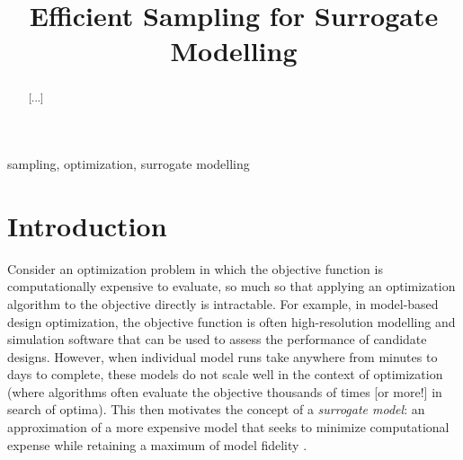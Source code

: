 \documentclass[conference]{IEEEtran}
\begin{document}

\title{Efficient Sampling for Surrogate Modelling}

\author{
}

\maketitle

\thispagestyle{plain}
\pagestyle{plain}



\begin{abstract}
[...]
\end{abstract}

\begin{IEEEkeywords}
sampling, optimization, surrogate modelling
\end{IEEEkeywords}



\section{Introduction}

	Consider an optimization problem in which the objective function is computationally expensive to evaluate, so much so that applying an optimization algorithm to the objective directly is intractable. For example, in model-based design optimization, the objective function is often high-resolution modelling and simulation software that can be used to assess the performance of candidate designs. However, when individual model runs take anywhere from minutes to days to complete, these models do not scale well in the context of optimization (where algorithms often evaluate the objective thousands of times [or more!] in search of optima). This then motivates the concept of a \textit{surrogate model}: an approximation of a more expensive model that seeks to minimize computational expense while retaining a maximum of model fidelity \cite{Forrester_2008}.
\end{document}
